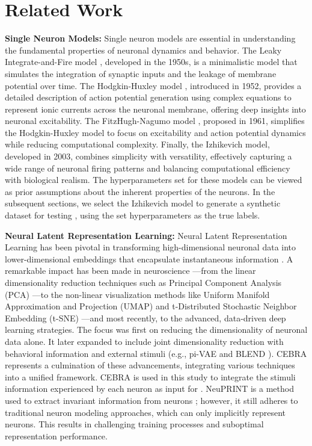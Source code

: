 \section{Related Work}
\textbf{Single Neuron Models:} Single neuron models are essential in understanding the fundamental properties of neuronal dynamics and behavior. The Leaky Integrate-and-Fire model \cite{liu2001spike}, developed in the 1950s, is a minimalistic model that simulates the integration of synaptic inputs and the leakage of membrane potential over time. The Hodgkin-Huxley model \cite{nelson1995hodgkin}, introduced in 1952, provides a detailed description of action potential generation using complex equations to represent ionic currents across the neuronal membrane, offering deep insights into neuronal excitability. The FitzHugh-Nagumo model \cite{izhikevich2006fitzhugh}, proposed in 1961, simplifies the Hodgkin-Huxley model to focus on excitability and action potential dynamics while reducing computational complexity. Finally, the Izhikevich model, developed in 2003, combines simplicity with versatility, effectively capturing a wide range of neuronal firing patterns and balancing computational efficiency with biological realism. The hyperparameters set for these models can be viewed as prior assumptions about the inherent properties of the neurons. In the subsequent sections, we select the Izhikevich model to generate a synthetic dataset for testing , using the set hyperparameters as the true labels. 

\textbf{Neural Latent Representation Learning:} Neural Latent Representation Learning has been pivotal in transforming high-dimensional neuronal data into lower-dimensional embeddings that encapsulate instantaneous information \cite{bengio2013representation}. A remarkable impact has been made in neuroscience —from the linear dimensionality reduction techniques such as Principal Component Analysis (PCA) \cite{mackiewicz1993principal}—to the non-linear visualization methods like Uniform Manifold Approximation and Projection (UMAP) \cite{mcinnes2018umap} and t-Distributed Stochastic Neighbor Embedding (t-SNE) \cite{kobak2019art}—and most recently, to the advanced, data-driven deep learning strategies. The focus was first on reducing the dimensionality of neuronal data alone. It later expanded to include joint dimensionality reduction with behavioral information and external stimuli (e.g., pi-VAE \cite{prakash2024interpreting} and BLEND \cite{guo2025blendbehaviorguidedneuralpopulation}). CEBRA represents a culmination of these advancements, integrating various techniques into a unified framework. CEBRA is used in this study to integrate the stimuli information experienced by each neuron as input for . NeuPRINT is a method used to extract invariant information from neurons \cite{mi2023learning}; however, it still adheres to traditional neuron modeling approaches, which can only implicitly represent neurons. This results in challenging training processes and suboptimal representation performance.

